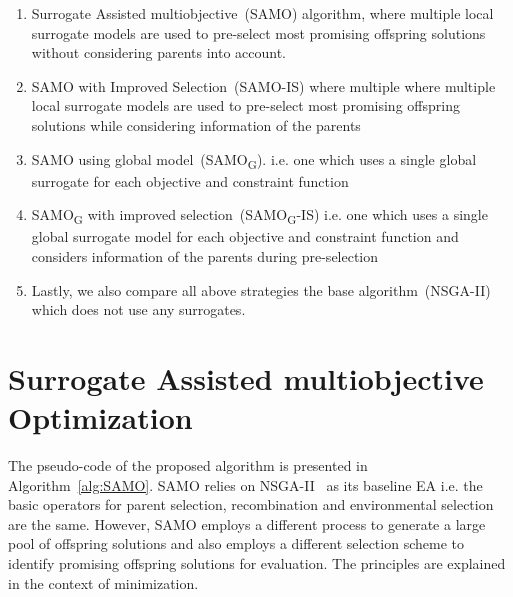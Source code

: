\begin{enumerate} 
	\item Surrogate
	Assisted multiobjective~(SAMO) algorithm, where multiple local surrogate models are used to
	pre-select most promising offspring solutions without considering parents into account. 
	\item SAMO with
	Improved Selection~(SAMO-IS) where multiple where multiple local surrogate models are used to
	pre-select most promising offspring solutions while considering information of the parents 
	\item SAMO using global model~(SAMO\textsubscript{G}). i.e. one which uses a single global surrogate for each objective
	and constraint function \item SAMO\textsubscript{G} with improved
	selection~(SAMO\textsubscript{G}-IS) i.e. one which uses a single global surrogate model for each objective
	and constraint function and considers information of the parents during pre-selection 
	\item Lastly, 
	we also compare all above strategies the base algorithm~(NSGA-II) which does not use any surrogates. 
\end{enumerate}

\section{Surrogate Assisted multiobjective Optimization} \label{sec:algo} The pseudo-code of the
proposed algorithm is presented in Algorithm~\ref{alg:SAMO}. SAMO relies on
NSGA-II~\cite{deb2002fae} as its baseline EA i.e. the basic operators for parent selection,
recombination and environmental selection are the same. However, SAMO employs a different process to
generate a large pool of offspring solutions and also employs a different selection scheme to
identify promising offspring solutions for evaluation. The principles are explained in the context of minimization. 


